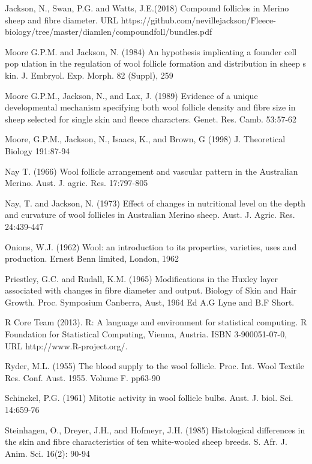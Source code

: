 \documentclass[titlepage]{article}  %
\begin{document}
\begin{thebibliography}{99}
Jackson, N., Swan, P.G. and Watts, J.E.(2018) Compound follicles in Merino sheep and fibre diameter. URL https://github.com/nevillejackson/Fleece-biology/tree/master/diamlen/compoundfoll/bundles.pdf


Moore G.P.M. and Jackson, N. (1984) An hypothesis implicating a founder cell pop
ulation in the regulation of wool follicle formation and distribution in sheep s
kin. J. Embryol. Exp. Morph. 82 (Suppl), 259

Moore G.P.M., Jackson, N., and Lax, J. (1989) Evidence of a unique developmental mechanism specifying both wool follicle density and fibre size in sheep selected for single skin and fleece characters. Genet. Res. Camb. 53:57-62

Moore, G.P.M., Jackson, N., Isaacs, K., and Brown, G (1998) J. Theoretical Biology 191:87-94

Nay T. (1966) Wool follicle arrangement and vascular pattern in the Australian Merino. Aust. J. agric. Res. 17:797-805

Nay, T. and Jackson, N. (1973) Effect of changes in nutritional level on the depth and curvature of wool follicles in Australian Merino sheep. Aust. J. Agric. Res. 24:439-447

Onions, W.J. (1962) Wool: an introduction to its properties, varieties, uses
     and production. Ernest Benn limited, London, 1962

Priestley, G.C. and Rudall, K.M. (1965) Modifications in the Huxley layer associated with changes in fibre diameter and output. Biology of Skin and Hair Growth. Proc. Symposium Canberra, Aust, 1964 Ed A.G Lyne and B.F Short.

R Core Team (2013). R: A language and environment for statistical
  computing. R Foundation for Statistical Computing, Vienna, Austria.
  ISBN 3-900051-07-0, URL http://www.R-project.org/.

Ryder, M.L. (1955) The blood supply to the wool follicle. Proc. Int. Wool Textile Res. Conf. Aust. 1955. Volume F. pp63-90

Schinckel, P.G. (1961) Mitotic activity in wool follicle bulbs. Aust. J. biol. Sci. 14:659-76

Steinhagen, O., Dreyer, J.H., and Hofmeyr, J.H. (1985) Histological differences in the skin and fibre characteristics of ten white-wooled sheep breeds. S. Afr. J. Anim. Sci. 16(2): 90-94


\end{thebibliography}
\end{document}

